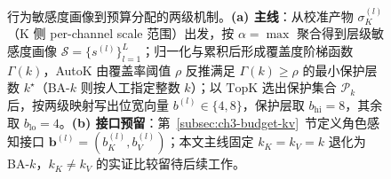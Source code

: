 \begin{figure}[!htbp]
{%
  }
  \caption{行为敏感度画像到预算分配的两级机制。\textbf{(a) 主线}：从校准产物 \(\sigma_K^{(l)}\)（K 侧 per-channel scale 范围）出发，按 \(\alpha=\max\) 聚合得到层级敏感度画像 \(\mathcal S=\{s^{(l)}\}_{l=1}^{L}\)；归一化与累积后形成覆盖度阶梯函数 \(\Gamma(k)\)，AutoK 由覆盖率阈值 \(\rho\) 反推满足 \(\Gamma(k)\!\ge\!\rho\) 的最小保护层数 \(k^\star\)（BA-\(k\) 则按人工指定整数 \(k\)）；以 \(\mathrm{TopK}\) 选出保护集合 \(\mathcal P_k\) 后，按两级映射写出位宽向量 \(b^{(l)}\!\in\!\{4,8\}\)，保护层取 \(b_\mathrm{hi}\!=\!8\)，其余取 \(b_\mathrm{lo}\!=\!4\)。\textbf{(b) 接口预留}：第~\ref{subsec:ch3-budget-kv}~节定义角色感知接口 \(\mathbf b^{(l)}=(b_K^{(l)},b_V^{(l)})\)；本文主线固定 \(k_K\!=\!k_V\!=\!k\) 退化为 BA-\(k\)，\(k_K\!\neq\!k_V\) 的实证比较留待后续工作。}
  \label{fig:ch3-allocation-flow}
\end{figure}
